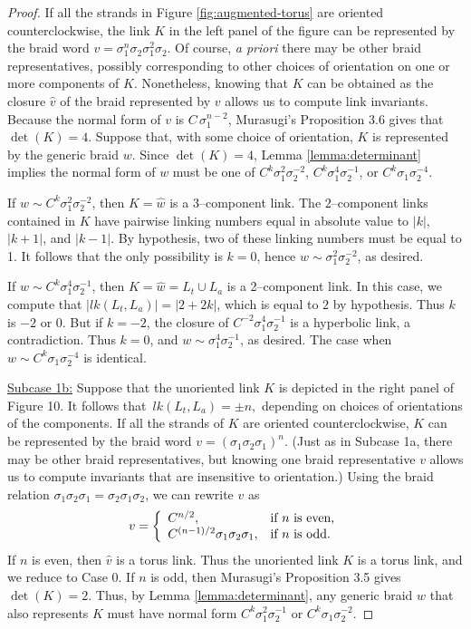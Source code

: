 \documentclass[11pt]{amsart}
\newcommand{\abs}[1]{{\left\vert #1 \right\vert}}
\theoremstyle{plain}
\theoremstyle{definition}
\begin{document}
\begin{proof}
If all the strands in Figure \ref{fig:augmented-torus} are oriented counterclockwise, the link $K$ in the 
left panel of the figure can
be represented by the braid word $v = \sigma_1^n \sigma_2 \sigma_1^2
\sigma_2$.  Of course, \emph{a priori}  there may be other braid
representatives, possibly corresponding to other choices of orientation on one or more components of $K$.  
Nonetheless, knowing that $K$ can be obtained as  the closure
$\hat{v}$ of the braid represented by $v$ allows us to compute link
invariants.  Because the normal form of $v$ is $C \,
\sigma_1^{n-2}$, Murasugi's Proposition 3.6 gives that $\det(K)=4$. 
Suppose that, with some choice of orientation, $K$ is represented by the generic braid $w$. Since $\det(K)=4$, Lemma \ref{lemma:determinant} implies the normal form of $w$ must be one of  $C^k \sigma_1^2 \sigma_2^{-2}$, $C^k \sigma_1^4
\sigma_2^{-1}$, or $C^k \sigma_1 \sigma_2^{-4}$.

If $w \sim C^k \sigma_1^2 \sigma_2^{-2}$, then $K = \hat{w}$ is a
3--component link.  The $2$--component links contained in $K$ have
pairwise linking numbers equal in absolute value to $\abs{k}$,
$\abs{k+1}$, and $\abs{k-1}$.   By hypothesis,  two of these linking numbers must be equal to 1.
It follows that the only possibility is $k = 0$, hence
$w \sim \sigma_1^2 \sigma_2^{-2}$, as desired.

If $w \sim C^k \sigma_1^{4} \sigma_2^{-1}$, then $K = \hat{w} = L_t
\cup L_a$ is a 2--component link.  In this case, we compute that
$\abs{lk(L_t, L_a)} = \abs{2+2k}$, which is equal to $2$ by
hypothesis.  Thus $k$ is $-2$ or $0$.  But if $k = -2$, the closure of
$C^{-2} \sigma_1^4 \sigma_2^{-1}$ is a hyperbolic link, a
contradiction.
Thus $k=0$, and $w \sim \sigma_1^4 \sigma_2^{-1}$, as desired. The
case when $w \sim C^k \sigma_1 \sigma_2^{-4}$ is identical.

\smallskip
\underline{Subcase 1b:} Suppose that the unoriented link $K$ is depicted in the right panel of Figure 10.
It follows that  $\, lk(L_t, L_a) = \pm n,$ depending on choices
of orientations of the components.
If all the strands of $K$ are oriented counterclockwise, $K$ can be represented by the braid word 
$v = (\sigma_1 \sigma_2 \sigma_1)^n$. (Just as in Subcase 1a, there may be other braid representatives, 
but knowing one braid representative $v$ allows us to compute invariants that are insensitive to orientation.) 
Using the
braid relation $\sigma_1 \sigma_2 \sigma_1 = \sigma_2 \sigma_1
\sigma_2$, we can rewrite $v$ as
$$v = \left\{ \begin{array}{l l} C^{n/2}, & \mbox{if $n$ is even,} \\
C^{(n-1)/2} \sigma_1 \sigma_2 \sigma_1, & \mbox{if $n$ is odd.}
\end{array} 
\right. $$
If $n$ is even, then $\hat v$ is a torus link. Thus the unoriented link $K$ is a torus link, and we reduce to Case 0. 
If $n$ is odd, then Murasugi's Proposition 3.5 gives $\det(K)=2$. 
Thus, by Lemma \ref{lemma:determinant}, any generic braid $w$ that also represents $K$ must have normal form
$C^k \sigma_1^{2} \sigma_2^{-1}$ or $C^k \sigma_1 \sigma_2^{-2}$.


\end{proof}
\end{document}
